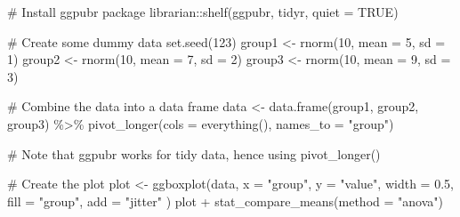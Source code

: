 \documentclass[
  letterpaper,
  DIV=11,
  numbers=noendperiod]{scrreprt}
\newenvironment{Shaded}{\begin{snugshade}}{\end{snugshade}}
\newcommand{\AttributeTok}[1]{\textcolor[rgb]{0.40,0.45,0.13}{#1}}
\newcommand{\CommentTok}[1]{\textcolor[rgb]{0.37,0.37,0.37}{#1}}
\newcommand{\ConstantTok}[1]{\textcolor[rgb]{0.56,0.35,0.01}{#1}}
\newcommand{\DecValTok}[1]{\textcolor[rgb]{0.68,0.00,0.00}{#1}}
\newcommand{\FloatTok}[1]{\textcolor[rgb]{0.68,0.00,0.00}{#1}}
\newcommand{\FunctionTok}[1]{\textcolor[rgb]{0.28,0.35,0.67}{#1}}
\newcommand{\NormalTok}[1]{\textcolor[rgb]{0.00,0.23,0.31}{#1}}
\newcommand{\OtherTok}[1]{\textcolor[rgb]{0.00,0.23,0.31}{#1}}
\newcommand{\SpecialCharTok}[1]{\textcolor[rgb]{0.37,0.37,0.37}{#1}}
\newcommand{\StringTok}[1]{\textcolor[rgb]{0.13,0.47,0.30}{#1}}
\begin{document}
\begin{Shaded}
\begin{Highlighting}[]
\CommentTok{\# Install ggpubr package}
\NormalTok{librarian}\SpecialCharTok{::}\FunctionTok{shelf}\NormalTok{(ggpubr, tidyr, }\AttributeTok{quiet =} \ConstantTok{TRUE}\NormalTok{)}

\CommentTok{\# Create some dummy data}
\FunctionTok{set.seed}\NormalTok{(}\DecValTok{123}\NormalTok{)}
\NormalTok{group1 }\OtherTok{\textless{}{-}} \FunctionTok{rnorm}\NormalTok{(}\DecValTok{10}\NormalTok{, }\AttributeTok{mean =} \DecValTok{5}\NormalTok{, }\AttributeTok{sd =} \DecValTok{1}\NormalTok{)}
\NormalTok{group2 }\OtherTok{\textless{}{-}} \FunctionTok{rnorm}\NormalTok{(}\DecValTok{10}\NormalTok{, }\AttributeTok{mean =} \DecValTok{7}\NormalTok{, }\AttributeTok{sd =} \DecValTok{2}\NormalTok{)}
\NormalTok{group3 }\OtherTok{\textless{}{-}} \FunctionTok{rnorm}\NormalTok{(}\DecValTok{10}\NormalTok{, }\AttributeTok{mean =} \DecValTok{9}\NormalTok{, }\AttributeTok{sd =} \DecValTok{3}\NormalTok{)}

\CommentTok{\# Combine the data into a data frame}
\NormalTok{data }\OtherTok{\textless{}{-}} \FunctionTok{data.frame}\NormalTok{(group1, group2, group3) }\SpecialCharTok{\%\textgreater{}\%}
  \FunctionTok{pivot\_longer}\NormalTok{(}\AttributeTok{cols =} \FunctionTok{everything}\NormalTok{(), }\AttributeTok{names\_to =} \StringTok{"group"}\NormalTok{)}

\CommentTok{\# Note that ggpubr works for tidy data, hence using pivot\_longer()}

\CommentTok{\# Create the plot}
\NormalTok{plot }\OtherTok{\textless{}{-}} \FunctionTok{ggboxplot}\NormalTok{(data,}
  \AttributeTok{x =} \StringTok{"group"}\NormalTok{,}
  \AttributeTok{y =} \StringTok{"value"}\NormalTok{,}
  \AttributeTok{width =} \FloatTok{0.5}\NormalTok{,}
  \AttributeTok{fill =} \StringTok{"group"}\NormalTok{,}
  \AttributeTok{add =} \StringTok{"jitter"}
\NormalTok{)}
\NormalTok{plot }\SpecialCharTok{+} \FunctionTok{stat\_compare\_means}\NormalTok{(}\AttributeTok{method =} \StringTok{"anova"}\NormalTok{)}
\end{Highlighting}
\end{Shaded}
\end{document}
